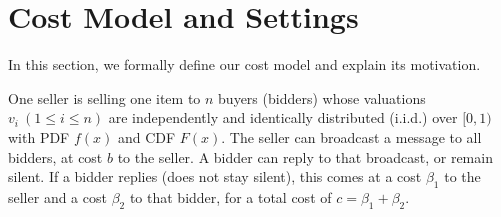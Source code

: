 \section{Cost Model and Settings}
\label{sec:model}

In this section, we formally define our cost model and explain its motivation. 


\begin{definition}[Setting]\label{def:model}
One seller is selling one item to $n$ buyers (bidders)
whose valuations $v_i~(1 \leq i \leq n)$ are independently and identically
distributed (i.i.d.) over $[0, 1)$ with PDF $f(x)$ and CDF $F(x)$. The seller
can broadcast a message to all bidders, at cost $b$ to
the seller.  A bidder can reply to that broadcast, or remain silent.
If a bidder replies (does not stay silent), this comes at a cost $\beta_1$ to the
seller and a cost $\beta_2$ to that bidder, for a total cost of $c=\beta_1+\beta_2$.
\end{definition}

%

